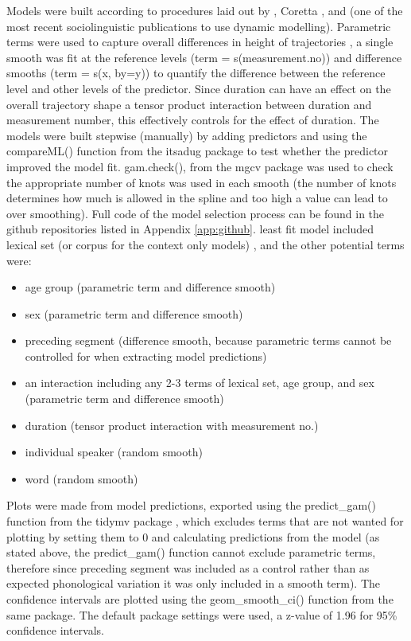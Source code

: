\documentclass[../../../00.FullDoc/tex/Thesis]{subfiles}
\begin{document}
Models were built according to procedures laid out by \cite{Soskuthy2017},  Coretta , and \cite{Stanley2021} (one of the most recent sociolinguistic publications to use dynamic modelling).
Parametric terms were used to capture overall differences in height of trajectories \citep{Soskuthy2017}, a single smooth was fit at the reference levels (term = s(measurement.no)) and difference smooths (term = s(x, by=y)) to quantify the difference between the reference level and other levels of the predictor. Since duration can have an effect on the overall trajectory shape a tensor product interaction between duration and measurement number, this effectively controls for the effect of duration.
The models were built stepwise (manually) by adding predictors and using the compareML() function from the itsadug package \citep{itsadug} to test whether the predictor improved the model fit. gam.check(), from the mgcv package \cite{mgcv} was used to check the appropriate number of knots was used in each smooth (the number of knots determines how much  is allowed in the spline and too high a value can lead to over smoothing). Full code of the model selection process can be found in the github repositories listed in Appendix \ref{app:github}. 
least fit model included lexical set (or corpus for the \hope{} context only models) , and the other potential terms were:
\begin{itemize}
	\item age group (parametric term and difference smooth)
	\item sex (parametric term and difference smooth)
	\item preceding segment (difference smooth, because parametric terms cannot be controlled for when extracting model predictions)
	\item an interaction including any 2-3 terms of lexical set, age group, and sex (parametric term and difference smooth)
	\item duration (tensor product interaction with measurement no.)
	\item individual speaker (random smooth)
	\item word (random smooth)
\end{itemize}


Plots were made from model predictions, exported using the predict\_gam() function from the tidymv package \citep{tidymv2020}, which excludes terms that are not wanted for plotting by setting them to 0 and calculating predictions from the model (as stated above, the predict\_gam() function cannot exclude parametric terms, therefore since preceding segment was included as a control rather than as expected phonological variation it was only included in a smooth term). The confidence intervals are plotted using the geom\_smooth\_ci() function from the same package. The default package settings were used, a z-value of 1.96 for 95\% confidence intervals.
\end{document}

